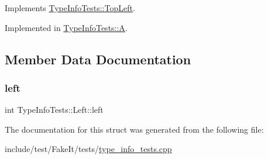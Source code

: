 Implements \mbox{\hyperlink{structTypeInfoTests_1_1TopLeft_aa7b113c1f915b757c8e42cca99f6081d}{Type\+Info\+Tests\+::\+Top\+Left}}.



Implemented in \mbox{\hyperlink{structTypeInfoTests_1_1A_a409df9b333807d1ec1f1005522a3f29b}{Type\+Info\+Tests\+::A}}.



\subsection{Member Data Documentation}
\mbox{\label{structTypeInfoTests_1_1Left_ab79f884f182b81959f3ca15f7b922963}} 
\subsubsection{\texorpdfstring{left}{left}}
{\footnotesize\ttfamily int Type\+Info\+Tests\+::\+Left\+::left}



The documentation for this struct was generated from the following file\+:\begin{DoxyCompactItemize}
\item 
include/test/\+Fake\+It/tests/\mbox{\hyperlink{type__info__tests_8cpp}{type\+\_\+info\+\_\+tests.\+cpp}}\end{DoxyCompactItemize}
